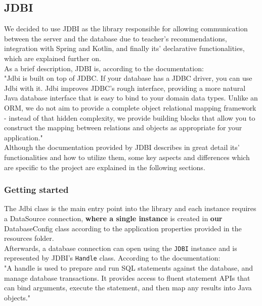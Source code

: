 \subsection{JDBI}

We decided to use JDBI as the library responsible for allowing communication between the server and the database due to teacher's
recommendations, integration with Spring and Kotlin, and finally its' declarative functionalities, which are explained further on.\\

As a brief description, JDBI is, according to the documentation:\\

"Jdbi is built on top of JDBC. If your database has a JDBC driver, you can use Jdbi with it.
Jdbi improves JDBC’s rough interface, providing a more natural Java database interface that is easy to bind to your domain data types.
Unlike an ORM, we do not aim to provide a complete object relational mapping framework - instead of that hidden complexity, we provide
building blocks that allow you to construct the mapping between relations and objects as appropriate for your application."\\

Although the documentation provided by JDBI describes in great detail its' functionalities and how to utilize them,
some key aspects and differences which are specific to the project are explained in the following sections.\\

\subsubsection{Getting started}

The Jdbi class is the main entry point into the library and each instance requires a DataSource
connection, \textbf{where a single instance} is created in \textbf{our} DatabaseConfig class according to the application properties provided in the resources folder. \\

Afterwards, a database connection can open using the \texttt{JDBI} instance and is represented by JDBI's \texttt{Handle} class. According to the documentation:\\

"A handle is used to prepare and run SQL statements against the database, and manage
database transactions. It provides access to fluent statement APIs that can bind arguments, execute
the statement, and then map any results into Java objects."\\

